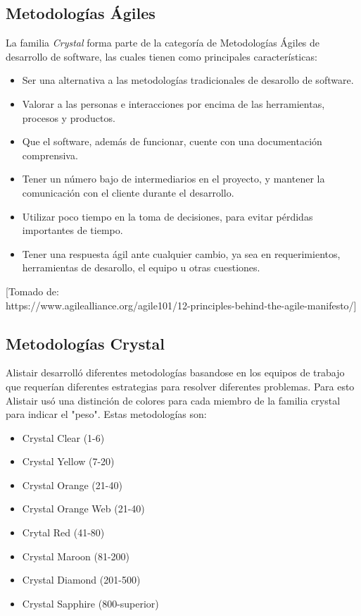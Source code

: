\documentclass[12pt,a4paper]{article}
\begin{document}
	\subsection*{Metodolog\'ias \'Agiles}
	La familia {\itshape Crystal} forma parte de la categor\'ia de Metodolog\'ias \'Agiles de desarrollo de software, las cuales tienen como principales caracter\'isticas:
	\begin{itemize}
		\item Ser una alternativa a las metodolog\'ias tradicionales de desarollo de software.
		
		\item Valorar a las personas e interacciones por encima de las herramientas, procesos y productos.
		
		\item Que el software, adem\'as de funcionar, cuente con una documentaci\'on comprensiva.
		
		\item Tener un n\'umero bajo de intermediarios en el proyecto, y mantener la comunicaci\'on con el cliente durante el desarrollo.
		
		\item Utilizar poco tiempo en la toma de decisiones, para evitar p\'erdidas importantes de tiempo.
		
		\item Tener una respuesta \'agil ante cualquier cambio, ya sea en requerimientos, herramientas de desarollo, el equipo u otras cuestiones.
		\\
	\end{itemize}
	
	
	[Tomado de:\\
	https://www.agilealliance.org/agile101/12-principles-behind-the-agile-manifesto/]\\
		
	\subsection*{Metodolog\'ias Crystal}
	Alistair desarroll\'o diferentes metodolog\'ias basandose en los equipos de trabajo que requer\'ian diferentes estrategias para resolver diferentes problemas.
	Para esto Alistair us\'o una distinci\'on de colores para cada miembro de la familia crystal para indicar el "peso". Estas metodolog\'ias son:
	\begin{itemize}
		\item Crystal Clear  (1-6)
		\item Crystal Yellow (7-20)
		\item Crystal Orange (21-40)
		\item Crystal Orange Web (21-40)
		\item Crytal Red (41-80)
		\item Crystal Maroon (81-200)
		\item Crystal Diamond (201-500)
		\item Crystal Sapphire (800-superior)
	\end{itemize}
	  
\end{document}
